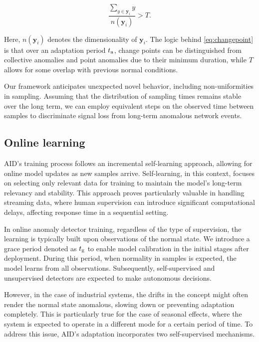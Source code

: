 \begin{equation}
  {\frac{\sum_{y\in \boldsymbol{y}_i}y}{n(\boldsymbol{y}_i)}} > T\text{.}\label{eq:changepoint}
\end{equation}

Here, \(n(\boldsymbol{y}_i)\) denotes the dimensionality of \(\boldsymbol{y}_i\). The logic behind \eqref{eq:changepoint} is that over an adaptation period $t _{\text{a}}$, change points can be distinguished from collective anomalies and point anomalies due to their minimum duration, while $T$ allows for some overlap with previous normal conditions.

Our framework anticipates unexpected novel behavior, including non-uniformities in sampling. Assuming that the distribution of sampling times remains stable over the long term, we can employ equivalent steps on the observed time between samples to discriminate signal loss from long-term anomalous network events.

\subsection{Online learning}\label{train}
AID's training process follows an incremental self-learning approach, allowing for online model updates as new samples arrive. Self-learning, in this context, focuses on selecting only relevant data for training to maintain the model's long-term relevancy and stability. This approach proves particularly valuable in handling streaming data, where human supervision can introduce significant computational delays, affecting response time in a sequential setting.

In online anomaly detector training, regardless of the type of supervision, the learning is typically built upon observations of the normal state. We introduce a grace period denoted as $t _{\text{g}}$ to enable model calibration in the initial stages after deployment. During this period, when normality in samples is expected, the model learns from all observations. Subsequently, self-supervised and unsupervised detectors are expected to make autonomous decisions.

However, in the case of industrial systems, the drifts in the concept might often render the normal state anomalous, slowing down or preventing adaptation completely. This is particularly true for the case of seasonal effects, where the system is expected to operate in a different mode for a certain period of time. To address this issue, AID's adaptation incorporates two self-supervised mechanisms.

